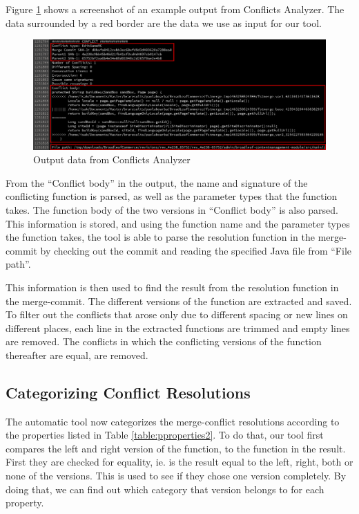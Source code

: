 Figure \ref{fig:screenshot} shows a screenshot of an example output from Conflicts Analyzer. The data surrounded by a red border are the data we use as input for our tool.
\begin{figure}[H]
\centering
\includegraphics[width=400pt]{figure/screenshot.png}
\caption{Output data from Conflicts Analyzer}\label{fig:screenshot}
\end{figure}

From the “Conflict body” in the output, the name and signature of the conflicting function is parsed, as well as the parameter types that the function takes. The function body of the two versions in “Conflict body” is also parsed. This information is stored, and using the function name and the parameter types the function takes, the tool is able to parse the resolution function in the merge-commit by checking out the commit and reading the specified Java file from “File path”.

This information is then used to find the result from the resolution function in the merge-commit. The different versions of the function are extracted and saved. To filter out the conflicts that arose only due to different spacing or new lines on different places, each line in the extracted functions are trimmed and empty lines are removed. The conflicts in which the conflicting versions of the function thereafter are equal, are removed.

\subsection{Categorizing Conflict Resolutions}
The automatic tool now categorizes the merge-conflict resolutions according to the properties listed in Table \ref{table:pproperties2}. To do that, our tool first compares the left and right version of the function, to the function in the result. First they are checked for equality, ie. is the result equal to the left, right, both or none of the versions. This is used to see if they chose one version completely. By doing that, we can find out which category that version belongs to for each property.

